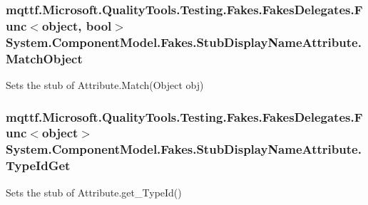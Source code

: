 \hypertarget{class_system_1_1_component_model_1_1_fakes_1_1_stub_display_name_attribute_a4cbe47df8f13b0eb785845a07932c52f}{
\subsubsection[{Match\-Object}]{\setlength{\rightskip}{0pt plus 5cm}mqttf.\-Microsoft.\-Quality\-Tools.\-Testing.\-Fakes.\-Fakes\-Delegates.\-Func$<$object, bool$>$ System.\-Component\-Model.\-Fakes.\-Stub\-Display\-Name\-Attribute.\-Match\-Object}}\label{class_system_1_1_component_model_1_1_fakes_1_1_stub_display_name_attribute_a4cbe47df8f13b0eb785845a07932c52f}


Sets the stub of Attribute.\-Match(\-Object obj)

\hypertarget{class_system_1_1_component_model_1_1_fakes_1_1_stub_display_name_attribute_ad65d3cd0a5f7dc494e6484d8223f7dea}{
\subsubsection[{Type\-Id\-Get}]{\setlength{\rightskip}{0pt plus 5cm}mqttf.\-Microsoft.\-Quality\-Tools.\-Testing.\-Fakes.\-Fakes\-Delegates.\-Func$<$object$>$ System.\-Component\-Model.\-Fakes.\-Stub\-Display\-Name\-Attribute.\-Type\-Id\-Get}}\label{class_system_1_1_component_model_1_1_fakes_1_1_stub_display_name_attribute_ad65d3cd0a5f7dc494e6484d8223f7dea}


Sets the stub of Attribute.\-get\-\_\-\-Type\-Id()




